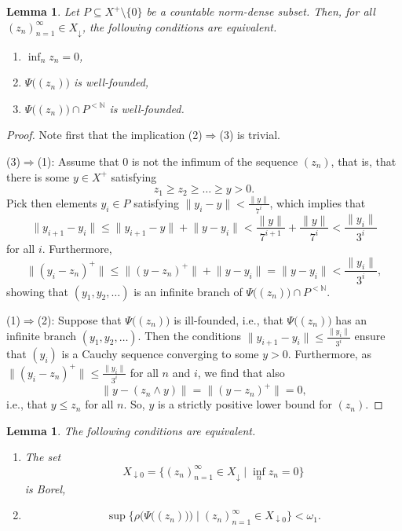 \documentclass[10pt]{amsart}
\newcommand{\norm}[1]{\lVert#1\rVert}
\newcommand{\Norm}[1]{\big\lVert#1\big\rVert}
\newcommand {\1}{\mathbb 1}
\newcommand {\N}{\mathbb N}
\newcommand{\om}{\omega}
\newcommand{\saa}{\Rightarrow}
\newcommand {\Del}{ \; \Big| \;}
\newcommand {\del}{ \; \big| \;}
\theoremstyle{plain}
\newtheorem{lemme}[thm]{Lemma}
\theoremstyle{definition}
\begin{document}
\begin{lemme}\label{WF}
Let $P\subseteq X^+\setminus \{0\}$ be a countable norm-dense subset. Then, for all $(z_n)_{n=1}^\infty\in X_\downarrow$, the following conditions are equivalent.
\begin{enumerate}
\item $\inf_n z_n=0$,
\item $\Psi \big((z_n)\big)$ is well-founded,
\item $\Psi \big((z_n)\big)\cap P^{<\N}$ is well-founded.
\end{enumerate}
\end{lemme}

\begin{proof}Note first that the implication (2)$\saa$(3) is trivial. 

(3)$\saa$(1): Assume that $0$ is not the infimum of the sequence $(z_n)$, that is, that there is some  $y\in X^+$ satisfying
$$
 z_1\geqslant z_2\geqslant \ldots\geqslant y> 0.
 $$
Pick then elements $y_{i}\in  P$ satisfying $\norm{y_i-y}<\tfrac{\norm{y}}{7^{i}}$, which implies that
$$
\norm{y_{i+1}-y_i}\leqslant \norm{y_{i+1}-y}+\norm{y-y_i}<\frac{\norm{y}}{7^{i+1}}+\frac{\norm{y}}{7^{i}}<\frac{\norm{y_i}}{3^{i}}
$$
for all $i$. Furthermore,
$$
\norm{(y_i-z_n)^+}\leqslant \norm{(y-z_n)^+}+\norm{y-y_i}=\norm{y-y_i}<\frac{\norm{y_i}}{3^{i}},
$$
showing that $(y_1,y_2,\ldots)$ is an infinite branch of $\Psi\big((z_n)\big)\cap P^{<\N}$.

(1)$\saa$(2): 
Suppose that $\Psi \big((z_n)\big)$ is ill-founded, i.e., that $\Psi \big((z_n)\big)$ has an infinite branch $(y_1,y_2,\ldots)$. Then the conditions $ \norm{y_{i+1}-y_i}\leqslant\frac{\norm{y_i}}{3^{i}}$ ensure that $(y_i)$ is a Cauchy sequence converging to some $y>0$. Furthermore, as $\norm{(y_i-z_n)^+}\leqslant \frac{\norm{y_i}}{3^{i}}$ for all $n$ and $i$, we find that also
$$
\Norm{y-(z_n\wedge y)}=\Norm{(y-z_n)^+}=0,
$$
i.e., that $y\leqslant z_n$ for all $n$. So, $y$ is a strictly positive lower bound for $(z_n)$.
\end{proof}


\begin{lemme}\label{lemma:BONS} 
The  following conditions are equivalent.
\begin{enumerate}
\item The set 
$$
X_{\downarrow0}=\big\{(z_n)_{n=1}^\infty\in X_{\downarrow}\del \inf_nz_n=0\big\}
$$
is Borel,
\item 
$$
\sup\Big\{\rho\Big(\Psi \big((z_n)\big)\Big)\Del {(z_n)_{n=1}^\infty\in X_{\downarrow0}}\Big\}<\om_1.
$$
\end{enumerate}
\end{lemme}
\end{document}
